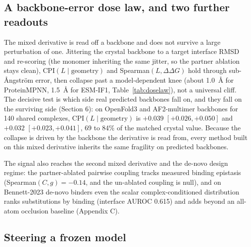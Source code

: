 \documentclass{article} %
\begin{document}

\subsection{A backbone-error dose law, and two further readouts}

The mixed derivative is read off a backbone and does not survive a large perturbation of one. Jittering the
crystal backbone to a target interface RMSD and re-scoring (the monomer inheriting the same jitter, so the partner
ablation stays clean), CPI$(L \mid \text{geometry})$ and Spearman$(L, \Delta\Delta G)$ hold through
sub-\AA{}ngstr\"om error, then collapse past a model-dependent knee (about 1.0~\AA{} for ProteinMPNN, 1.5~\AA{} for
ESM-IF1, Table~\ref{tab:doselaw}), not a universal cliff. The decisive test is which side real predicted backbones
fall on, and they fall on the surviving side (Section 6): on OpenFold3 and AF2-multimer
\citep{jumper2021alphafold} backbones for 140 shared complexes, CPI$(L \mid \text{geometry})$ is $+0.039$ $[+0.026,
+0.050]$ and $+0.032$ $[+0.023, +0.041]$, 69 to 84\% of the matched crystal value. Because the collapse is driven
by the backbone the derivative is read from, every method built on this mixed derivative inherits the same
fragility on predicted backbones.


The signal also reaches the second mixed derivative and the de-novo design regime: the partner-ablated pairwise
coupling tracks measured binding epistasis (Spearman$(C, g) = -0.14$, and the un-ablated coupling is null), and on
Bennett-2023 de-novo binders even the scalar complex-conditioned distribution ranks substitutions by binding
(interface AUROC 0.615) and adds beyond an all-atom occlusion baseline (Appendix C).



\subsection{Steering a frozen model}
\end{document}

